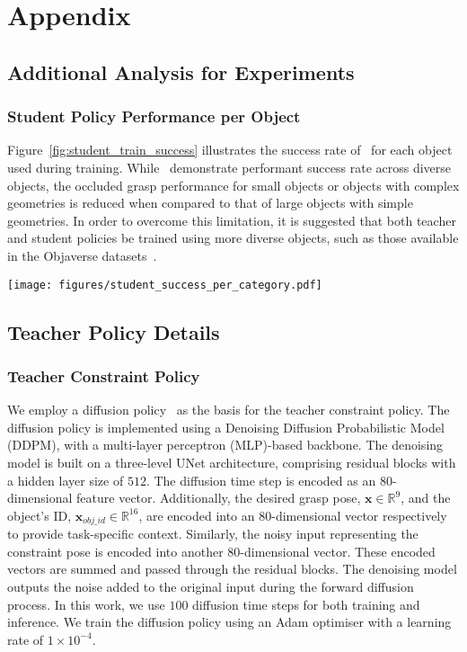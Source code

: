 \section{Appendix}
\subsection{Additional Analysis for Experiments}
\label{appendix:analysis}
\subsubsection{Student Policy Performance per Object}
Figure~\ref{fig:student_train_success} illustrates the success rate of \ourmethod~for each object used during training.
While \ourmethod~demonstrate performant success rate across diverse objects, the occluded grasp performance for small objects or objects with complex geometries is reduced when compared to that of large objects with simple geometries.
In order to overcome this limitation, it is suggested that both teacher and student policies be trained using more diverse objects, such as those available in the Objaverse datasets~\cite{deitke2023objaverse}.


\begin{figure*}
    \centering
    \texttt{[image: figures/student\_success\_per\_category.pdf]}
    \caption{\textbf{Grasp performance of \ourmethod's student policies for each object in simulation. The success rate is averaged over $50$ trials.}}
    \label{fig:student_train_success}
\end{figure*}



\subsection{Teacher Policy Details}
\label{appendix:teacher}


\subsubsection{Teacher Constraint Policy}
\label{appendix:teacher_const}
We employ a diffusion policy~\cite{chi2023diffusion} as the basis for the teacher constraint policy. The diffusion policy is implemented using a Denoising Diffusion Probabilistic Model (DDPM), with a multi-layer perceptron (MLP)-based backbone.
The denoising model is built on a three-level UNet architecture, comprising residual blocks with a hidden layer size of $512$.
The diffusion time step is encoded as an $80$-dimensional feature vector. 
Additionally, the desired grasp pose, $\mathbf{x} \in \mathbb{R}^{9}$, and the object's ID, $\mathbf{x}_{obj\_id} \in \mathbb{R}^{16}$, are encoded into an $80$-dimensional vector respectively to provide task-specific context. 
Similarly, the noisy input representing the constraint pose is encoded into another $80$-dimensional vector. 
These encoded vectors are summed and passed through the residual blocks. 
The denoising model outputs the noise added to the original input during the forward diffusion process.
In this work, we use $100$ diffusion time steps for both training and inference.
We train the diffusion policy using an Adam optimiser with a learning rate of $1\times 10^{-4}$.



